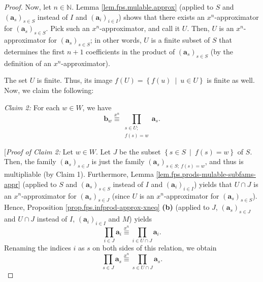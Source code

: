 \begin{fineprint}
\begin{proof}
Now, let $n\in\mathbb{N}$. Lemma \ref{lem.fps.mulable.approx} (applied to $S$
and $\left(  \mathbf{a}_{s}\right)  _{s\in S}$ instead of $I$ and $\left(
\mathbf{a}_{i}\right)  _{i\in I}$) shows that there exists an $x^{n}%
$-approximator for $\left(  \mathbf{a}_{s}\right)  _{s\in S}$. Pick such an
$x^{n}$-approximator, and call it $U$. Then, $U$ is an $x^{n}$-approximator
for $\left(  \mathbf{a}_{s}\right)  _{s\in S}$; in other words, $U$ is a
finite subset of $S$ that determines the first $n+1$ coefficients in the
product of $\left(  \mathbf{a}_{s}\right)  _{s\in S}$ (by the definition of an
$x^{n}$-approximator).

The set $U$ is finite. Thus, its image $f\left(  U\right)  =\left\{  f\left(
u\right)  \ \mid\ u\in U\right\}  $ is finite as well. Now, we claim the following:

\begin{statement}
\textit{Claim 2:} For each $w\in W$, we have%
\[
\mathbf{b}_{w}\overset{x^{n}}{\equiv}\prod_{\substack{s\in U;\\f\left(
s\right)  =w}}\mathbf{a}_{s}.
\]

\end{statement}

[\textit{Proof of Claim 2:} Let $w\in W$. Let $J$ be the subset $\left\{  s\in
S\ \mid\ f\left(  s\right)  =w\right\}  $ of $S$. Then, the family $\left(
\mathbf{a}_{s}\right)  _{s\in J}$ is just the family $\left(  \mathbf{a}%
_{s}\right)  _{s\in S;\ f\left(  s\right)  =w}$, and thus is multipliable (by
Claim 1). Furthermore, Lemma \ref{lem.fps.prods-mulable-subfams-appr} (applied
to $S$ and $\left(  \mathbf{a}_{s}\right)  _{s\in S}$ instead of $I$ and
$\left(  \mathbf{a}_{i}\right)  _{i\in I}$) yields that $U\cap J$ is an
$x^{n}$-approximator for $\left(  \mathbf{a}_{s}\right)  _{s\in J}$ (since $U$
is an $x^{n}$-approximator for $\left(  \mathbf{a}_{s}\right)  _{s\in S}$).
Hence, Proposition \ref{prop.fps.infprod-approx-xneq} \textbf{(b)} (applied to
$J$, $\left(  \mathbf{a}_{s}\right)  _{s\in J}$ and $U\cap J$ instead of $I$,
$\left(  \mathbf{a}_{i}\right)  _{i\in I}$ and $M$) yields
\[
\prod_{i\in J}\mathbf{a}_{i}\overset{x^{n}}{\equiv}\prod_{i\in U\cap
J}\mathbf{a}_{i}.
\]
Renaming the indices $i$ as $s$ on both sides of this relation, we obtain%
\begin{equation}
\prod_{s\in J}\mathbf{a}_{s}\overset{x^{n}}{\equiv}\prod_{s\in U\cap
J}\mathbf{a}_{s}. \label{pf.prop.fps.prods-mulable-rules.SW1.c2.pf.1}%
\end{equation}



\end{proof}
\end{fineprint}
